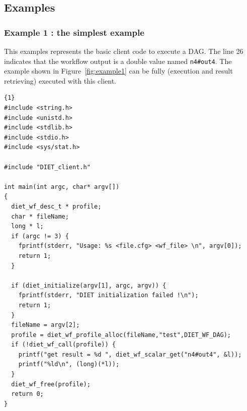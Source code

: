 \subsection{Examples}
\label{sec:examples}


\subsubsection{Example 1 : the simplest example}
\label{sec:ex1}

This examples represents the basic client code to execute a DAG.
The line 26 indicates that the workflow output is a double value named
\verb|n4#out4|. The example shown in Figure~\ref{fig:example1} can be
fully (execution and result retrieving) executed with this client.

\begin{lstlisting}{1}
#include <string.h>
#include <unistd.h>
#include <stdlib.h>
#include <stdio.h>
#include <sys/stat.h>

#include "DIET_client.h"

int main(int argc, char* argv[])
{
  diet_wf_desc_t * profile;
  char * fileName;
  long * l;
  if (argc != 3) {
    fprintf(stderr, "Usage: %s <file.cfg> <wf_file> \n", argv[0]);
    return 1;
  }

  if (diet_initialize(argv[1], argc, argv)) {
    fprintf(stderr, "DIET initialization failed !\n");
    return 1;
  }
  fileName = argv[2];
  profile = diet_wf_profile_alloc(fileName,"test",DIET_WF_DAG);
  if (!diet_wf_call(profile)) {
    printf("get result = %d ", diet_wf_scalar_get("n4#out4", &l));
    printf("%ld\n", (long)(*l));
  }
  diet_wf_free(profile);
  return 0;
}
\end{lstlisting}

